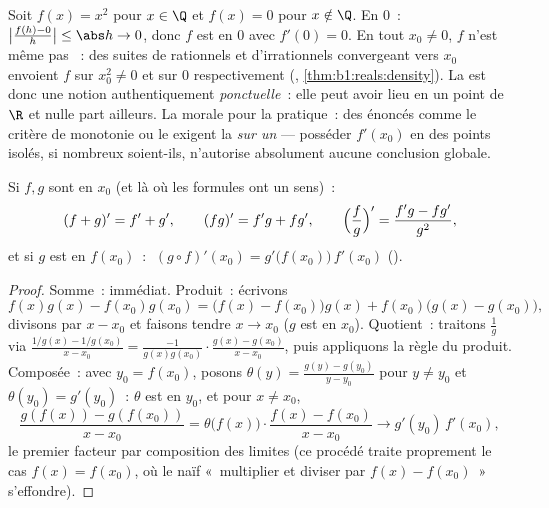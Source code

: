 \begin{example}\label{ex:b1:derivative:onepoint}
Soit $f(x) = x^2$ pour $x \in \Q$ et $f(x) = 0$ pour $x \notin
\Q$. En $0$~: $\bigl|\frac{f(h) - 0}{h}\bigr| \leq \abs h \to 0$,
donc $f$ est  en $0$ avec $f'(0) = 0$. En tout $x_0
\neq 0$, $f$ n'est même pas ~: des suites de rationnels et
d'irrationnels convergeant vers $x_0$ envoient $f$ sur $x_0^2 \neq 0$ et sur
$0$ respectivement (, \cref{thm:b1:reals:density}). La
 est donc une notion authentiquement \emph{ponctuelle}~: elle peut
avoir lieu en un point de $\R$ et nulle part ailleurs. La morale pour
la pratique~: des énoncés comme le critère de monotonie ou le 
exigent la  \emph{sur un } --- posséder
$f'(x_0)$ en des points isolés, si nombreux soient-ils, n'autorise
absolument aucune conclusion globale.
\end{example}

\begin{theorem}[Opérations]\label{thm:b1:derivative:operations}
Si $f, g$ sont  en $x_0$ (et là où les formules ont un
sens)~:
\[
(f + g)' = f' + g', \qquad
(fg)' = f'g + fg', \qquad
\Bigl(\frac fg\Bigr)' = \frac{f'g - fg'}{g^2},
\]
et si $g$ est  en $f(x_0)$~:
$\;(g \circ f)'(x_0) = g'\bigl(f(x_0)\bigr)\, f'(x_0)$ ().
\end{theorem}

\begin{proof}
Somme~: immédiat. Produit~: écrivons
\[
f(x)g(x) - f(x_0)g(x_0)
= \bigl(f(x) - f(x_0)\bigr) g(x) + f(x_0)\bigl(g(x) - g(x_0)\bigr),
\]
divisons par $x - x_0$ et faisons tendre $x \to x_0$ ($g$ est  en $x_0$).
Quotient~: traitons $\frac 1g$ via $\frac{1/g(x) - 1/g(x_0)}{x - x_0} =
\frac{-1}{g(x)g(x_0)}\cdot\frac{g(x) - g(x_0)}{x - x_0}$, puis appliquons
la règle du produit. Composée~: avec $y_0 = f(x_0)$, posons
$\theta(y) = \frac{g(y) - g(y_0)}{y - y_0}$ pour $y \neq y_0$ et
$\theta(y_0) = g'(y_0)$~: $\theta$ est  en $y_0$, et pour
$x \neq x_0$,
\[
\frac{g(f(x)) - g(f(x_0))}{x - x_0}
= \theta\bigl(f(x)\bigr)\cdot \frac{f(x) - f(x_0)}{x - x_0}
\longrightarrow g'(y_0)\, f'(x_0),
\]
le premier facteur par composition des limites (ce procédé traite
proprement le cas $f(x) = f(x_0)$, où le naïf «~multiplier et diviser
par $f(x) - f(x_0)$~» s'effondre).
\end{proof}

